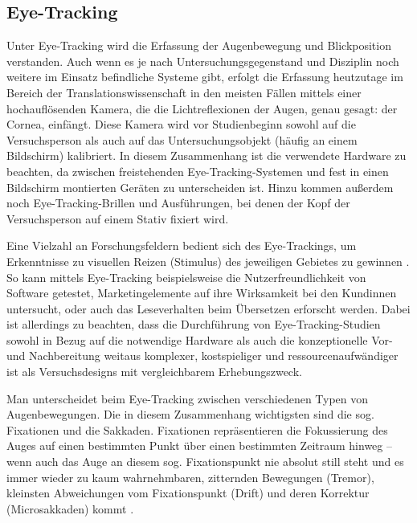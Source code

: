 
\subsection{Eye-Tracking}
\label{K5:subsec:EyeTracking}


Unter Eye-Tracking wird die Erfassung der Augenbewegung und Blickposition verstanden. Auch wenn es je nach Untersuchungsgegenstand und Disziplin noch weitere im Einsatz befindliche Systeme gibt, erfolgt die Erfassung heutzutage im Bereich der Translationswissenschaft in den meisten Fällen mittels einer hochauflösenden Kamera, die die Lichtreflexionen der Augen, genau gesagt: der Cornea, einfängt. Diese Kamera wird vor Studienbeginn sowohl auf die Versuchsperson als auch auf das Untersuchungsobjekt (häufig an einem Bildschirm) kalibriert. In diesem Zusammenhang ist die verwendete Hardware zu beachten, da zwischen freistehenden Eye-Tracking-Systemen und fest in einen Bildschirm montierten Geräten zu unterscheiden ist. Hinzu kommen außerdem noch Eye-Tracking-Brillen und Ausführungen, bei denen der Kopf der Versuchsperson auf einem Stativ fixiert wird.

Eine Vielzahl an Forschungsfeldern bedient sich des Eye-Trackings, um Erkenntnisse zu visuellen Reizen (Stimulus) des jeweiligen Gebietes zu gewinnen \citep[3]{bergstrom_eye_2014}. So kann mittels Eye-Tracking beispielsweise die Nutzerfreundlichkeit von Software getestet, Marketingelemente auf ihre Wirksamkeit bei den Kund{\textperiodcentered}innen untersucht, oder auch das Leseverhalten beim Übersetzen erforscht werden. Dabei ist allerdings zu beachten, dass die Durchführung von Eye-Tracking-Studien sowohl in Bezug auf die notwendige Hardware als auch die konzeptionelle Vor- und Nachbereitung weitaus komplexer, kostspieliger und ressourcenaufwändiger ist als Versuchsdesigns mit vergleichbarem Erhebungszweck.

Man unterscheidet beim Eye-Tracking zwischen verschiedenen Typen von Augenbewegungen. Die in diesem Zusammenhang wichtigsten sind die sog. Fixationen und die Sakkaden. Fixationen repräsentieren die Fokussierung des Auges auf einen bestimmten Punkt über einen bestimmten Zeitraum hinweg -- wenn auch das Auge an diesem sog. Fixationspunkt nie absolut still steht und es immer wieder zu kaum wahrnehmbaren, zitternden Bewegungen (Tremor), kleinsten Abweichungen vom Fixationspunkt (Drift) und deren Korrektur (Microsakkaden) kommt \citep[22]{holmqvist_eye_2011}.

